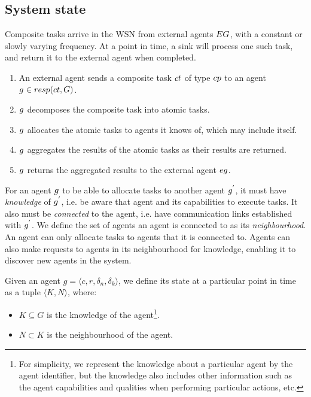\subsection{System state}

Composite tasks arrive in the WSN from external agents $\setExternalAgent{}{}$, with a constant or slowly varying frequency. At a point in time, a sink will process one such task, and return it to the external agent when completed.
\begin{enumerate}
	\item An external agent sends a composite task $\varCompositeTask{}{}$ of type $\varCompositeTaskType{}{}$ to an agent $\varAgent{}{} \in \functionTaskResponsibilities{}{}$. 
	\item $g_{}^{}$ decomposes the composite task into atomic tasks.
	\item $g_{}^{}$ allocates the atomic tasks to agents it knows of, which may include itself.
	\item $g_{}^{}$ aggregates the results of the atomic tasks as their results are returned.
	\item $g_{}^{}$ returns the aggregated results to the external agent $\varExternalAgent{}{}$.
\end{enumerate}

For an agent $g_{}^{}$ to be able to allocate tasks to another agent $g_{}^{'}$, it must have \textit{knowledge} of $g_{}^{'}$, i.e. be aware that agent and its capabilities to execute tasks. It also must be \textit{connected} to the agent, i.e. have communication links established with $g_{}^{'}$. We define the set of agents an agent is connected to as its \textit{neighbourhood}. An agent can only allocate tasks to agents that it is connected to. Agents can also make requests to agents in its neighbourhood for knowledge, enabling it to discover new agents in the system.
 

\begin{definition}
	\label{def:agent-state}
	Given an agent $g=\langle c, r, \delta_n, \delta_k \rangle$, we define its state at a particular point in time as a tuple $\langle K, N\rangle$, where:
	\begin{itemize}
		\item $K\subseteq G$ is the knowledge of the agent\footnote{For simplicity, we represent the knowledge about a particular agent by the agent identifier, but the knowledge also includes other information such as the agent capabilities and qualities when performing particular actions, etc. }.
		\item $N\subset K$ is the neighbourhood of the agent.
	\end{itemize}
\end{definition}

